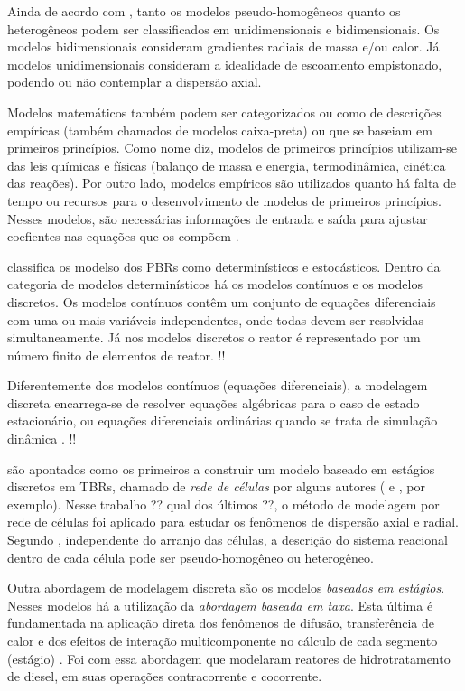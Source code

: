 Ainda de acordo com , tanto os modelos pseudo-homogêneos
quanto os heterogêneos podem ser classificados em unidimensionais e
bidimensionais. Os modelos bidimensionais consideram gradientes radiais de massa
e/ou calor. Já modelos unidimensionais consideram a idealidade de escoamento
empistonado, podendo ou não contemplar a dispersão axial.

Modelos matemáticos também podem ser categorizados ou como de
descrições empíricas (também chamados de modelos caixa-preta) ou que se baseiam
em primeiros princípios. Como nome diz, modelos de primeiros princípios
utilizam-se das leis químicas e físicas (balanço de massa e energia,
termodinâmica, cinética das reações). Por outro lado, modelos empíricos são
utilizados quanto há falta de tempo ou recursos para o desenvolvimento de
modelos de primeiros princípios. Nesses modelos, são necessárias informações de
entrada e saída para ajustar coefientes nas equações que os compõem
\cite{Edgar2001}.

\cite{Lamb1963} classifica os modelso dos PBRs como determinísticos e
estocásticos. Dentro da categoria de modelos determinísticos há os modelos
contínuos e os modelos discretos. Os modelos contínuos contêm um conjunto de
equações diferenciais com uma ou mais variáveis independentes, onde todas devem
ser resolvidas simultaneamente. Já nos modelos discretos o reator é representado
por um número finito de elementos de reator. !!

Diferentemente dos modelos contínuos (equações diferenciais), a modelagem
discreta encarrega-se de resolver equações algébricas para o caso de estado
estacionário, ou equações diferenciais ordinárias quando se trata de simulação
dinâmica \cite{Schnitzlein1987}. !!

 são apontados como os primeiros a construir um modelo
baseado em estágios discretos em TBRs, chamado de \emph{rede de células} por
alguns autores ( e , por
exemplo). Nesse trabalho ?? qual dos últimos ??, o método de modelagem por rede
de células foi aplicado para estudar os fenômenos de dispersão axial e radial. Segundo
, independente do arranjo das células, a descrição
do sistema reacional dentro de cada célula pode ser pseudo-homogêneo ou
heterogêneo.

Outra abordagem de modelagem discreta são os modelos \emph{baseados em
estágios}. Nesses modelos há a utilização da \emph{abordagem baseada em taxa}.
Esta última é fundamentada na aplicação direta dos fenômenos de difusão,
transferência de calor e dos efeitos de interação multicomponente no cálculo de
cada segmento (estágio) \cite{Jakobsson2004}. Foi com essa abordagem que
 modelaram reatores de hidrotratamento de diesel, em
suas operações contracorrente e cocorrente.

